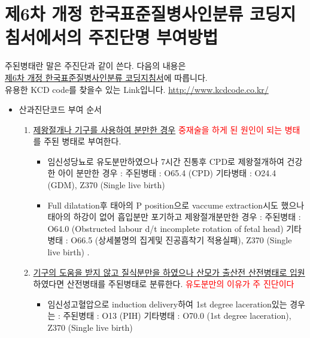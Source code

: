 \section{제6차 개정 한국표준질병사인분류 코딩지침서에서의 주진단명 부여방법}
주된병태란 말은 주진단과 같이 쓴다. 다음의 내용은\\ \href{http://kostat.go.kr/kssc/common/CommonAction.do?method=download&attachDir=bm90aWNl&attachName=JUVEJTk1JTlDJUVBJUI1JUFEJUVEJTkxJTlDJUVDJUE0JTgwJUVDJUE3JTg4JUVCJUIzJTkxJUVDJTgyJUFDJUVDJTlEJUI4JUVCJUI2JTg0JUVCJUE1JTk4XyVFQyVBNyU4OCVFQiVCMyU5MSVFQyVCRCU5NCVFQiU5NCVBOSVFQyVBNyU4MCVFQyVCOSVBOCVFQyU4NCU5QyUyODIwMTIuMDMlMjkucGRm} {제6차 개정 한국표준질병사인분류 코딩지침서}에 따릅니다.\\
유용한 KCD code를 찾을수 있는 Link입니다. \url{http://www.kcdcode.co.kr/}
\begin{itemize}[▷]\tightlist
\item 산과진단코드 부여 순서
	\begin{enumerate}\tightlist
	\item \uline{제왕절개나 기구를 사용하여 분만한 경우} \textcolor{red}{중재술을 하게 된 원인이 되는 병태}를 주된 병태로 부여한다.
		\begin{mdframed}[linecolor=blue,middlelinewidth=2]
			\begin{itemize}\tightlist
			\item 임신성당뇨로 유도분만하였으나 7시간 진통후 CPD로 제왕절개하여 건강한 아이 분만한 경우 :  주된병태 : O65.4 (CPD) 기타병태 : O24.4 (GDM), Z370 (Single live birth) 
			\item Full dilatation후 태아의 P position으로 vaccume extraction시도 했으나 태아의 하강이 없어 흡입분만 포기하고 제왕절개분만한 경우 :  주된병태 : O64.0 (Obstructed labour d/t incomplete rotation of fetal head) 기타병태 : O66.5 (상세불명의 집게및 진공흡착기 적용실패), Z370 (Single live birth) .
			
			\end{itemize}
		\end{mdframed}
	\item \uline{기구의 도움을 받지 않고 질식분만을 하였으나 산모가 출산전 산전병태로 입원}하였다면 산전병태를 주된병태로 분류한다. \textcolor{red}{유도분만의 이유가 주 진단이다}
		\begin{mdframed}[linecolor=blue,middlelinewidth=2]
		\begin{itemize}\tightlist
		\item 임신성고혈압으로 induction delivery하여 1st degree laceration있는 경우는  : 주된병태 : O13 (PIH) 기타병태 : O70.0 (1st degree laceration), Z370 (Single live birth) 
		\end{itemize}
		\end{mdframed}
		

\end{enumerate}
\end{itemize}
